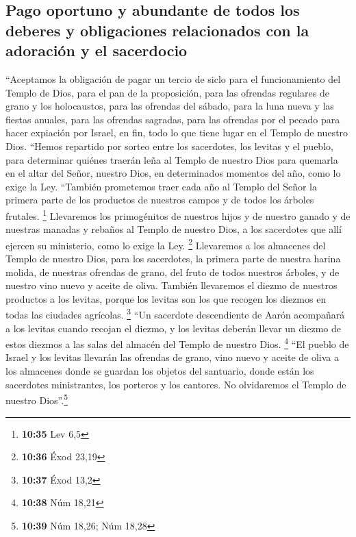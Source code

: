 \hypertarget{pago-oportuno-y-abundante-de-todos-los-deberes-y-obligaciones-relacionados-con-la-adoraciuxf3n-y-el-sacerdocio}{%
\subsection{Pago oportuno y abundante de todos los deberes y
obligaciones relacionados con la adoración y el
sacerdocio}\label{pago-oportuno-y-abundante-de-todos-los-deberes-y-obligaciones-relacionados-con-la-adoraciuxf3n-y-el-sacerdocio}}

 ``Aceptamos la obligación de pagar un tercio de siclo
para el funcionamiento del Templo de Dios,  para el pan
de la proposición, para las ofrendas regulares de grano y los
holocaustos, para las ofrendas del sábado, para la luna nueva y las
fiestas anuales, para las ofrendas sagradas, para las ofrendas por el
pecado para hacer expiación por Israel, en fin, todo lo que tiene lugar
en el Templo de nuestro Dios.  ``Hemos repartido por
sorteo entre los sacerdotes, los levitas y el pueblo, para determinar
quiénes traerán leña al Templo de nuestro Dios para quemarla en el altar
del Señor, nuestro Dios, en determinados momentos del año, como lo exige
la Ley.  ``También prometemos traer cada año al Templo
del Señor la primera parte de los productos de nuestros campos y de
todos los árboles frutales. \footnote{\textbf{10:35} Lev 6,5}
 Llevaremos los primogénitos de nuestros hijos y de
nuestro ganado y de nuestras manadas y rebaños al Templo de nuestro
Dios, a los sacerdotes que allí ejercen su ministerio, como lo exige la
Ley. \footnote{\textbf{10:36} Éxod 23,19}  Llevaremos a
los almacenes del Templo de nuestro Dios, para los sacerdotes, la
primera parte de nuestra harina molida, de nuestras ofrendas de grano,
del fruto de todos nuestros árboles, y de nuestro vino nuevo y aceite de
oliva. También llevaremos el diezmo de nuestros productos a los levitas,
porque los levitas son los que recogen los diezmos en todas las ciudades
agrícolas. \footnote{\textbf{10:37} Éxod 13,2}  ``Un
sacerdote descendiente de Aarón acompañará a los levitas cuando recojan
el diezmo, y los levitas deberán llevar un diezmo de estos diezmos a las
salas del almacén del Templo de nuestro Dios. \footnote{\textbf{10:38}
  Núm 18,21}  ``El pueblo de Israel y los levitas
llevarán las ofrendas de grano, vino nuevo y aceite de oliva a los
almacenes donde se guardan los objetos del santuario, donde están los
sacerdotes ministrantes, los porteros y los cantores. No olvidaremos el
Templo de nuestro Dios''.\footnote{\textbf{10:39} Núm 18,26; Núm 18,28}

